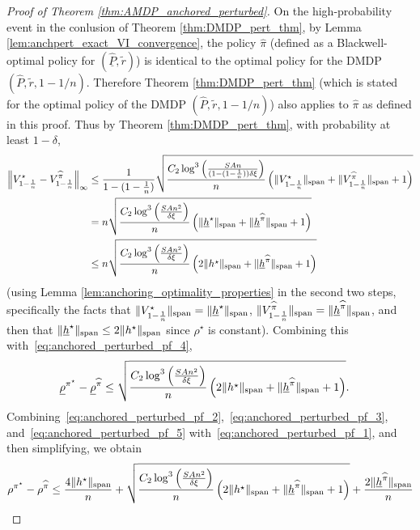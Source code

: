 \documentclass{article}
\theoremstyle{plain}
\theoremstyle{plain}
\theoremstyle{remark}
\theoremstyle{plain}
\theoremstyle{plain}
\newcommand{\Phat}{\widehat{P}}
\newcommand{\pistar}{\pi^\star}
\newcommand{\pihat}{\widehat{\pi}}
\newcommand{\Phatanc}{\underline{\Phat}}
\newcommand{\rhoanc}{\underline{\rho}}
\newcommand{\hanc}{\underline{h}}
\begin{document}
\begin{proof}[Proof of Theorem \ref{thm:AMDP_anchored_perturbed}]
    On the high-probability event in the conlusion of Theorem \ref{thm:DMDP_pert_thm}, by Lemma \ref{lem:anchpert_exact_VI_convergence}, the policy $\pihat$ (defined as a Blackwell-optimal policy for $(\Phatanc, \widetilde{r})$) is identical to the optimal policy for the DMDP $(\Phat, \widetilde{r}, 1-1/n)$. Therefore Theorem \ref{thm:DMDP_pert_thm} (which is stated for the optimal policy of the DMDP $(\Phat, \widetilde{r}, 1-1/n)$) also applies to $\pihat$ as defined in this proof. Thus by Theorem \ref{thm:DMDP_pert_thm}, with probability at least $1 - \delta$,
    \begin{align*}
        \infnorm{V^{\star}_{1-\frac{1}{n}} - V^{\pihat}_{1-\frac{1}{n}}} & \leq \frac{1 }{1-(1-\frac{1}{n})}\sqrt{\frac{C_2  \log^3 \left( \frac{SAn}{(1-(1-\frac{1}{n})) \delta \xi}\right) }{n}\left( \spannorm{V_{1-\frac{1}{n}}^{\star}} + \spannorm{V_{1-\frac{1}{n}}^{\pihat}} + 1\right) } \\
        &= n \sqrt{\frac{C_2  \log^3 \left( \frac{SAn^2}{ \delta \xi}\right) }{n}\left( \spannorm{\hanc^\star} + \spannorm{\hanc^{\pihat}} + 1\right) } \\
        &\leq n \sqrt{\frac{C_2  \log^3 \left( \frac{SAn^2}{ \delta \xi}\right) }{n}\left( 2\spannorm{h^\star} + \spannorm{\hanc^{\pihat}} + 1\right) }
    \end{align*}
    (using Lemma \ref{lem:anchoring_optimality_properties} in the second two steps, specifically the facts that $\spannorm{V_{1-\frac{1}{n}}^{\star}} = \spannorm{\hanc^\star}$,  $ \spannorm{V_{1-\frac{1}{n}}^{\pihat}} = \spannorm{\hanc^{\pihat}}$, and then that $\spannorm{\hanc^\star} \leq 2 \spannorm{h^\star}$ since $\rho^\star$ is constant).
    Combining this with~\eqref{eq:anchored_perturbed_pf_4},
    \begin{align}
        \rhoanc^{\pistar} - \rhoanc^{\pihat} &\leq \sqrt{\frac{C_2  \log^3 \left( \frac{SAn^2}{ \delta \xi}\right) }{n}\left( 2\spannorm{h^\star} + \spannorm{\hanc^{\pihat}} + 1\right) }\label{eq:anchored_perturbed_pf_5}.
    \end{align}
    Combining~\eqref{eq:anchored_perturbed_pf_2},~\eqref{eq:anchored_perturbed_pf_3}, and~\eqref{eq:anchored_perturbed_pf_5} with~\eqref{eq:anchored_perturbed_pf_1}, and then simplifying, we obtain
    \begin{align*}
        \rho^{\pistar} - \rho^{\pihat} & \leq \frac{4\spannorm{h^\star}}{n} + \sqrt{\frac{C_2  \log^3 \left( \frac{SAn^2}{ \delta \xi }\right) }{n}\left( 2\spannorm{h^\star} + \spannorm{\hanc^{\pihat}} + 1\right) } + \frac{2\spannorm{\hanc^{\pihat}}}{n} \\

\end{align*}
\end{proof}
\end{document}
